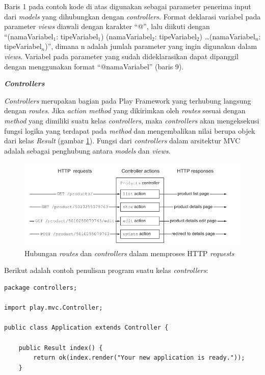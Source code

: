 \documentclass[a4paper,twoside]{article}
\begin{document}
\begin{enumerate}
\begin{itemize}
Baris 1 pada contoh kode di atas digunakan sebagai parameter penerima input dari \textit{models} yang dihubungkan dengan \textit{controllers}. Format deklarasi variabel pada parameter \textit{views} diawali dengan karakter ``@'', lalu diikuti dengan ``(namaVariabel$_1$: tipeVariabel$_1$) (namaVariabel$_2$: tipeVariabel$_2$) \ldots (namaVariabel$_n$: tipeVariabel$_n$)'', dimana n adalah jumlah parameter yang ingin digunakan dalam \textit{views}. Variabel pada parameter yang sudah dideklarasikan dapat dipanggil dengan menggunakan format ``@namaVariabel'' (baris 9).

\textbf{\textit{Controllers}}

\textit{Controllers} merupakan bagian pada Play Framework yang terhubung langsung dengan \textit{routes}. Jika \textit{action method} yang dikirimkan oleh \textit{routes} sesuai dengan \textit{method} yang dimiliki suatu kelas \textit{controllers}, maka \textit{controllers} akan mengeksekusi fungsi logika yang terdapat pada \textit{method} dan mengembalikan nilai berupa objek dari kelas \textit{Result} (gambar \ref{fig:2_controllers1}). Fungsi dari \textit{controllers} dalam arsitektur MVC adalah sebagai penghubung antara \textit{models} dan \textit{views}. 

\begin{figure}[htbp]
	\centering	
		\includegraphics[scale=0.7]{Gambar/2_controllers1.PNG}
	\caption{Hubungan \textit{routes} dan \textit{controllers} dalam memproses HTTP \textit{requests}\cite{playforjava}}
	\label{fig:2_controllers1}
\end{figure}

Berikut adalah contoh penulisan program suatu kelas \textit{controllers}:

\begin{lstlisting}
package controllers;

import play.mvc.Controller;

public class Application extends Controller {

	public Result index() {
		return ok(index.render("Your new application is ready."));
	}


\end{lstlisting}
\end{itemize}
\end{enumerate}
\end{document}
